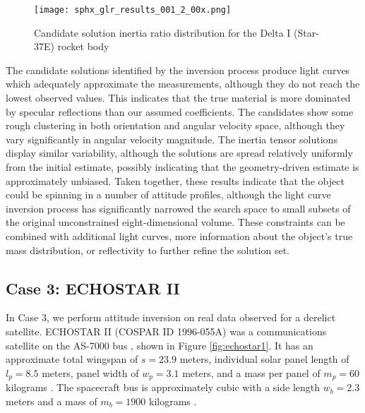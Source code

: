 \documentclass[a4paper,twocolumn]{spaceDebrisC} %
\newcommand{\figmed}[0]{0.4\textwidth}
\newcommand{\figsmall}[0]{0.3\textwidth}
\begin{document}

\begin{figure}[H]
  \centering
  \texttt{[image: sphx\_glr\_results\_001\_2\_00x.png]}
  \caption{Candidate solution inertia ratio distribution for the Delta I (Star-37E) rocket body}
  \label{fig:case2_i}
\end{figure}

The candidate solutions identified by the inversion process produce light curves which adequately approximate the measurements, although they do not reach the lowest observed values. This indicates that the true material is more dominated by specular reflections than our assumed coefficients. The candidates show some rough clustering in both orientation and angular velocity space, although they vary significantly in angular velocity magnitude. The inertia tensor solutions display similar variability, although the solutions are spread relatively uniformly from the initial estimate, possibly indicating that the geometry-driven estimate is approximately unbiased. Taken together, these results indicate that the object could be spinning in a number of attitude profiles, although the light curve inversion process has significantly narrowed the search space to small subsets of the original unconstrained eight-dimensional volume. These constraints can be combined with additional light curves, more information about the object's true mass distribution, or reflectivity to further refine the solution set.

\subsection{Case 3: ECHOSTAR II}

In Case 3, we perform attitude inversion on real data observed for a derelict satellite. ECHOSTAR II (COSPAR ID 1996-055A) was a communications satellite on the AS-7000 bus \cite{as7000_astronautix}, shown in Figure \ref{fig:echostar1}. It has an approximate total wingspan of $s = 23.9$ meters, individual solar panel length of $l_p=8.5$ meters, panel width of $w_p=3.1$ meters, and a mass per panel of $m_p = 60$ kilograms \cite{earl2015}. The spacecraft bus is approximately cubic with a side length $w_b=2.3$ meters and a mass of $m_b = 1900$ kilograms \cite{earl2015}.
\end{document}
